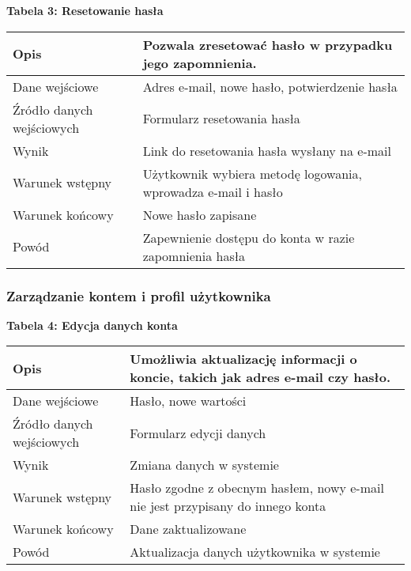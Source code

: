 \newpage

\textbf{Tabela 3: Resetowanie hasła}
\begin{table}[h]
  \begin{tabular}{|p{3cm}|p{\dimexpr\textwidth-3cm\relax}|} \hline
    Opis & Pozwala zresetować hasło w przypadku jego zapomnienia. \\\hline
    Dane wejściowe & Adres e-mail, nowe hasło, potwierdzenie hasła \\\hline
    Źródło danych wejściowych & Formularz resetowania hasła \\\hline
    Wynik & Link do resetowania hasła wysłany na e-mail \\\hline
    Warunek wstępny & Użytkownik wybiera metodę logowania, wprowadza e-mail i hasło \\\hline
    Warunek końcowy & Nowe hasło zapisane \\\hline
    Powód & Zapewnienie dostępu do konta w razie zapomnienia hasła \\\hline
  \end{tabular}
\end{table}

\subsubsection{Zarządzanie kontem i proﬁl użytkownika}

\textbf{Tabela 4: Edycja danych konta}
\begin{table}[h]
  \begin{tabular}{|p{3cm}|p{\dimexpr\textwidth-3cm\relax}|} \hline
    Opis & Umożliwia aktualizację informacji o koncie, takich jak adres e-mail czy hasło. \\\hline
    Dane wejściowe & Hasło, nowe wartości \\\hline
    Źródło danych wejściowych & Formularz edycji danych \\\hline
    Wynik & Zmiana danych w systemie \\\hline
    Warunek wstępny & Hasło zgodne z obecnym hasłem, nowy e-mail nie jest przypisany do innego konta \\\hline
    Warunek końcowy & Dane zaktualizowane \\\hline
    Powód & Aktualizacja danych użytkownika w systemie \\\hline
  \end{tabular}
\end{table}

\newpage

